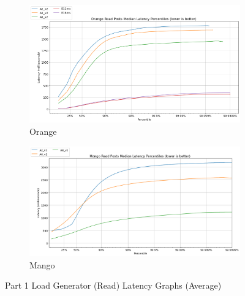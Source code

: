 \begin{figure}[H]
     \centering
     \begin{subfigure}[b]{0.49\textwidth}
         \centering
         \includegraphics[width=\textwidth]{images/orange_read.png}
         \caption{Orange} 
         \label{fig:orange_read}
     \end{subfigure}
     \hfill
     \begin{subfigure}[b]{0.49\textwidth}
         \centering
         \includegraphics[width=\textwidth]{images/mango_read.png}
         \caption{Mango}
         \label{fig:mango_read}
     \end{subfigure}
    
        \caption{Part 1 Load Generator (Read) Latency Graphs  (Average)}
        \label{fig:part_2_read}
\end{figure}

